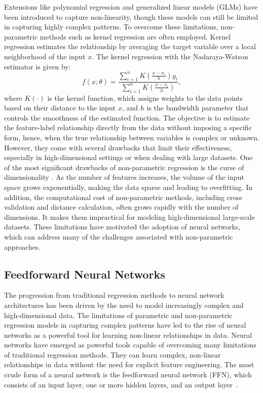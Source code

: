 Extensions like polynomial regression and generalized linear models (GLMs) have been introduced to capture non-linearity, though these models can still be limited in capturing highly complex patterns. 
To overcome these limitations, non-parametric methods such as kernel regression \citep{hastie2009elements} are often employed. 
Kernel regression estimates the relationship by averaging the target variable over a local neighborhood of the input $x$.
The kernel regression with the Nadaraya-Watson estimator is given by:
\begin{equation}
    f(x; \theta) = \frac{\sum_{i=1}^{n} K\left(\frac{x-x_i}{h}\right) y_i}{\sum_{i=1}^{n} K\left(\frac{x-x_i}{h}\right)},
\end{equation}
where $K(\cdot)$ is the kernel function, which assigns weights to the data points based on their distance to the input $x$, and $h$ is the bandwidth parameter that controls the smoothness of the estimated function.
The objective is to estimate the feature-label relationship directly from the data without imposing a specific form, hence, when the true relationship between variables is complex or unknown.
However, they come with several drawbacks that limit their effectiveness, especially in high-dimensional settings or when dealing with large datasets. 
One of the most significant drawbacks of non-parametric regression is the curse of dimensionality \cite{bellman1966dynamic}. 
As the number of features increases, the volume of the input space grows exponentially, making the data sparse and leading to overfitting.
In addition, the computational cost of non-parametric methods, including cross validation and distance calculation, often grows rapidly with the number of dimensions.
It makes them impractical for modeling high-dimensional large-scale datasets. 
These limitations have motivated the adoption of neural networks, which can address many of the challenges associated with non-parametric approaches.

\subsection{Feedforward Neural Networks}

The progression from traditional regression methods to neural network architectures has been driven by the need to model increasingly complex and high-dimensional data.
The limitations of parametric and non-parametric regression models in capturing complex patterns have led to the rise of neural networks as a powerful tool for learning non-linear relationships in data.
Neural networks have emerged as powerful tools capable of overcoming many limitations of traditional regression methods. 
They can learn complex, non-linear relationships in data without the need for explicit feature engineering.
The most crude form of a neural network is the feedforward neural network (FFN), which consists of an input layer, one or more hidden layers, and an output layer~\citep{goodfellow2016}.

